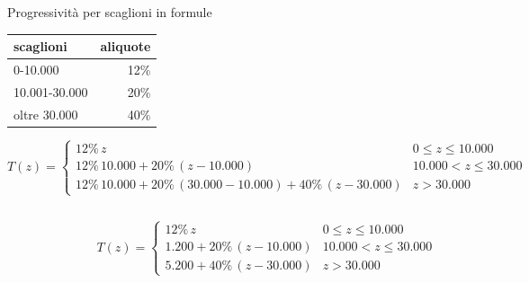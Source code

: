\documentclass[aspectratio=64,12pt]{beamer}
\newcommand\€{\,\text{€}}
\begin{document}
\begin{frame}{Progressività per scaglioni in formule}

  \centering
{}
%  
  \begin{tabular}[b]{lr}
\toprule scaglioni & aliquote \\ \midrule 
0-10.000 & 12\% \\ 
  10.001-30.000 & 20\% \\ 
  oltre 30.000 & 40\% \\
  \bottomrule
  \end{tabular}
  \hspace{3cm}

  \begin{equation*}
  T(z)=
  \begin{cases}
    12\%\, z & 0\le z\le10.000\\
    12\%\, 10.000 + 20\%\, (z-10.000) & 10.000<z\le30.000\\
    12\%\, 10.000 + 20\%\, (30.000-10.000) + 40\%\,(z-30.000) & z > 30.000
  \end{cases}
\end{equation*}

\begin{columns}
  \begin{column}{.25\textwidth}
    \hfill
{}
\end{column}
% 
\begin{column}{.6\textwidth}
  \begin{equation*}
  T(z)=
  \begin{cases}
    12\%\,z & 0\le z\le10.000\\
    1.200 + 20\%\,(z-10.000) & 10.000<z\le30.000\\
    5.200 + 40\%\,(z-30.000) & z > 30.000
  \end{cases}
\end{equation*}
\end{column}
\end{columns}
\end{frame}
\end{document}
